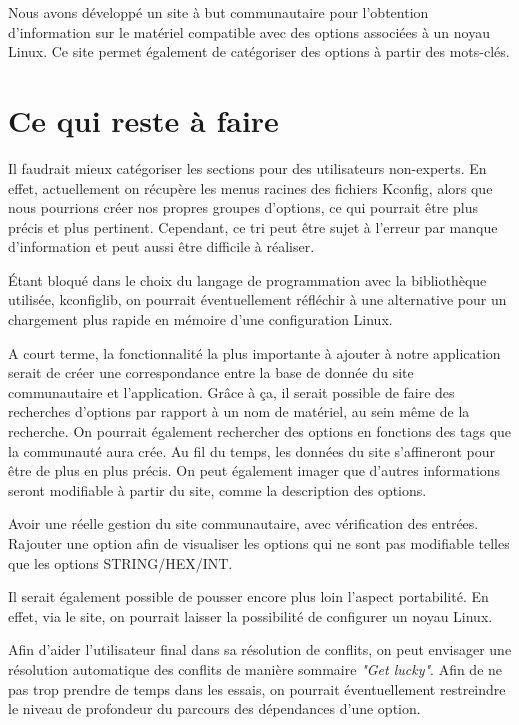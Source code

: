 \documentclass[16pts]{report}
\begin{document}
    Nous avons développé un site à but communautaire pour l'obtention d'information
    sur le matériel compatible avec des options associées à un noyau Linux. Ce site
    permet également de catégoriser des options à partir des mots-clés.

    \section{Ce qui reste à faire}
    \label{sec:Ce qui reste à faire}
    Il faudrait mieux catégoriser les sections pour des utilisateurs non-experts.
    En effet, actuellement on récupère les menus racines des fichiers Kconfig,
    alors que nous pourrions créer nos propres groupes d'options, ce qui pourrait
    être plus précis et plus pertinent. Cependant, ce tri peut être sujet à l'erreur
    par manque d'information et peut aussi être difficile à réaliser.

    Étant bloqué dans le choix du langage de programmation avec la bibliothèque
    utilisée, kconfiglib, on pourrait éventuellement réfléchir à une alternative
    pour un chargement plus rapide en mémoire d'une configuration Linux.

    A court terme, la fonctionnalité la plus importante à ajouter
    à notre application serait de créer une correspondance entre la base de donnée du
    site communautaire et l'application. Grâce à ça, il serait possible de faire des
    recherches d'options par rapport à un nom de matériel, au sein même de la
    recherche. On pourrait également rechercher des options en fonctions des
    tags que la communauté aura crée. Au fil du temps, les données du site
    s'affineront pour être de plus en plus précis. On peut également
    imager que d'autres informations seront modifiable à partir du site,
    comme la description des options.

    Avoir une réelle gestion du site communautaire, avec vérification des entrées.
    Rajouter une option afin de visualiser les options qui ne sont pas modifiable
        telles que les options STRING/HEX/INT.

    Il serait également possible de pousser encore plus loin l'aspect portabilité.
    En effet, via le site, on pourrait laisser la possibilité de configurer un
    noyau Linux.

    Afin d'aider l'utilisateur final dans sa résolution de conflits, on peut
    envisager une résolution automatique des conflits de manière sommaire
    \textit{"Get lucky"}.  Afin de ne pas trop prendre de temps dans les
    essais, on pourrait éventuellement restreindre le niveau de profondeur du
    parcours des dépendances d'une option.
\end{document}
